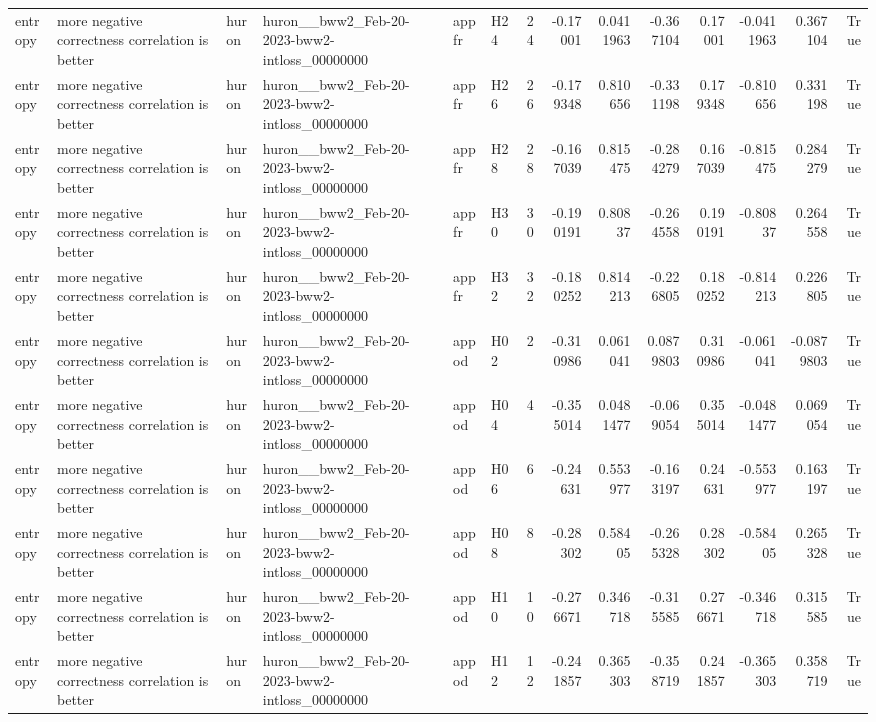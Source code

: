 \begin{longtable}{llllllrrrrrrrr}
entropy & more negative correctness correlation is better & huron & huron\_\_bww2\_Feb-20-2023-bww2-intloss\_00000000 & appfr & H24 & 24 & -0.17001 & 0.0411963 & -0.367104 & 0.17001 & -0.0411963 & 0.367104 & True \\
entropy & more negative correctness correlation is better & huron & huron\_\_bww2\_Feb-20-2023-bww2-intloss\_00000000 & appfr & H26 & 26 & -0.179348 & 0.810656 & -0.331198 & 0.179348 & -0.810656 & 0.331198 & True \\
entropy & more negative correctness correlation is better & huron & huron\_\_bww2\_Feb-20-2023-bww2-intloss\_00000000 & appfr & H28 & 28 & -0.167039 & 0.815475 & -0.284279 & 0.167039 & -0.815475 & 0.284279 & True \\
entropy & more negative correctness correlation is better & huron & huron\_\_bww2\_Feb-20-2023-bww2-intloss\_00000000 & appfr & H30 & 30 & -0.190191 & 0.80837 & -0.264558 & 0.190191 & -0.80837 & 0.264558 & True \\
entropy & more negative correctness correlation is better & huron & huron\_\_bww2\_Feb-20-2023-bww2-intloss\_00000000 & appfr & H32 & 32 & -0.180252 & 0.814213 & -0.226805 & 0.180252 & -0.814213 & 0.226805 & True \\
entropy & more negative correctness correlation is better & huron & huron\_\_bww2\_Feb-20-2023-bww2-intloss\_00000000 & appod & H02 & 2 & -0.310986 & 0.061041 & 0.0879803 & 0.310986 & -0.061041 & -0.0879803 & True \\
entropy & more negative correctness correlation is better & huron & huron\_\_bww2\_Feb-20-2023-bww2-intloss\_00000000 & appod & H04 & 4 & -0.355014 & 0.0481477 & -0.069054 & 0.355014 & -0.0481477 & 0.069054 & True \\
entropy & more negative correctness correlation is better & huron & huron\_\_bww2\_Feb-20-2023-bww2-intloss\_00000000 & appod & H06 & 6 & -0.24631 & 0.553977 & -0.163197 & 0.24631 & -0.553977 & 0.163197 & True \\
entropy & more negative correctness correlation is better & huron & huron\_\_bww2\_Feb-20-2023-bww2-intloss\_00000000 & appod & H08 & 8 & -0.28302 & 0.58405 & -0.265328 & 0.28302 & -0.58405 & 0.265328 & True \\
entropy & more negative correctness correlation is better & huron & huron\_\_bww2\_Feb-20-2023-bww2-intloss\_00000000 & appod & H10 & 10 & -0.276671 & 0.346718 & -0.315585 & 0.276671 & -0.346718 & 0.315585 & True \\
entropy & more negative correctness correlation is better & huron & huron\_\_bww2\_Feb-20-2023-bww2-intloss\_00000000 & appod & H12 & 12 & -0.241857 & 0.365303 & -0.358719 & 0.241857 & -0.365303 & 0.358719 & True \\

\end{longtable}

